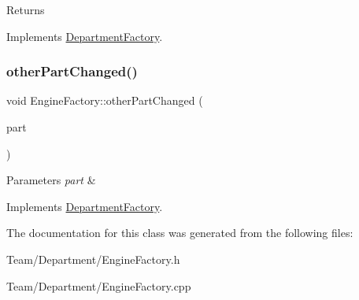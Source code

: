 \begin{DoxyReturn}{Returns}

\end{DoxyReturn}


Implements \hyperlink{classDepartmentFactory_a5aac775b89c4c390ad885e1de8947b0d}{Department\+Factory}.

\mbox{\label{classEngineFactory_a12c1223834cb2d653a1c659aa1504c51}} 
\subsubsection{\texorpdfstring{other\+Part\+Changed()}{otherPartChanged()}}
{\footnotesize\ttfamily void Engine\+Factory\+::other\+Part\+Changed (\begin{DoxyParamCaption}\item[{\hyperlink{classDepartmentOutput}{Department\+Output} $\ast$}]{part }\end{DoxyParamCaption})\hspace{0.3cm}{\ttfamily [virtual]}}


\begin{DoxyParams}{Parameters}
{\em part} & \\
\hline
\end{DoxyParams}


Implements \hyperlink{classDepartmentFactory_a41e5c96ee84f8237cb08d31cd782efae}{Department\+Factory}.



The documentation for this class was generated from the following files\+:\begin{DoxyCompactItemize}
\item 
Team/\+Department/Engine\+Factory.\+h\item 
Team/\+Department/Engine\+Factory.\+cpp\end{DoxyCompactItemize}

